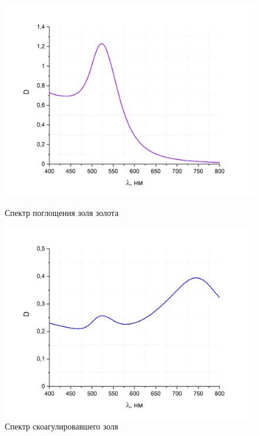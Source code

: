 \documentclass[a4paper, 12pt]{article}
\begin{document}
\begin{figure}[h]
\begin{center}
\begin{minipage}[h]{0.49\linewidth}
\includegraphics[width=1\textwidth]{abs.png}
\caption{Спектр поглощения золя золота} %
\label{ris:experimoriginal} %
\end{minipage}
\hfill 
\begin{minipage}[h]{0.49\linewidth}
\includegraphics[width=1\textwidth]{abs_coag.png}
\caption{Спектр скоагулировавшего золя}
\label{ris:experimcoded}
\end{minipage}
\end{center}
\end{figure}
\end{document}
